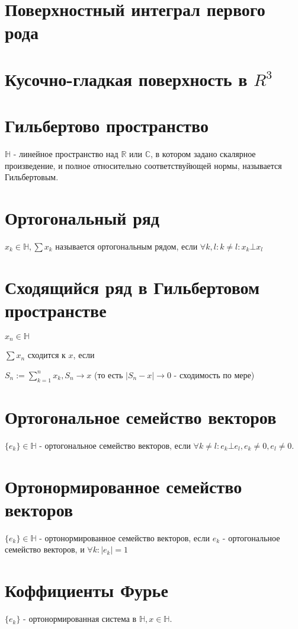 \documentclass[paper=a4, fontsize=17pt]{article}
\begin{document}
	\section{Поверхностный интеграл первого рода}
	
	\section{Кусочно-гладкая поверхность в $R^3$}
	
	\section{Гильбертово пространство}
	$\mathds{H}$ - линейное пространство над $\mathds{R}$ или $\mathds{C}$, в котором задано скалярное произведение, и полное относительно соответствуйющей нормы, называется Гильбертовым.
	
	\section{Ортогональный ряд}
	$x_k \in \mathds{H}, \sum x_k$ называется ортогональным рядом, если $\forall k, l: k \neq l: x_k \bot x_l$
	
	\section{Сходящийся ряд в Гильбертовом пространстве}
	$x_n \in \mathds{H}$
	
	$\sum x_n$ сходится к $x$, если
	
	$S_n := \sum\limits_{k = 1}^n x_k, S_n \rightarrow x$ (то есть $|S_n - x| \rightarrow 0$ - сходимость по мере) 
	
	\section{Ортогональное семейство векторов}
	$\{e_k\} \in \mathds{H}$ - ортогональное семейство векторов, если $\forall k \neq l: e_k \bot e_l, e_k \neq 0, e_l \neq 0$.
	
	\section{Ортонормированное семейство векторов}
	$\{e_k\} \in \mathds{H}$ - ортонормированное семейство векторов, если ${e_k}$ - ортогональное семейство векторов, и $\forall k: |e_k| = 1 $
	
	\section{Коффициенты Фурье}
	$\{e_k\}$ - ортонормированная система в $\mathds{H}, x \in \mathds{H}$.
	
\end{document}
